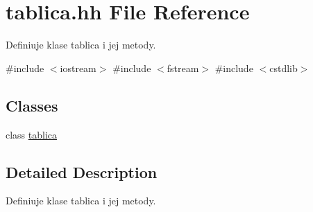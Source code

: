 \hypertarget{tablica_8hh}{\section{tablica.\-hh \-File \-Reference}
\label{tablica_8hh}
}


\-Definiuje klase tablica i jej metody.  


{\ttfamily \#include $<$iostream$>$}\*
{\ttfamily \#include $<$fstream$>$}\*
{\ttfamily \#include $<$cstdlib$>$}\*
\subsection*{\-Classes}
\begin{DoxyCompactItemize}
\item 
class \hyperlink{classtablica}{tablica}
\end{DoxyCompactItemize}


\subsection{\-Detailed \-Description}
\-Definiuje klase tablica i jej metody. 